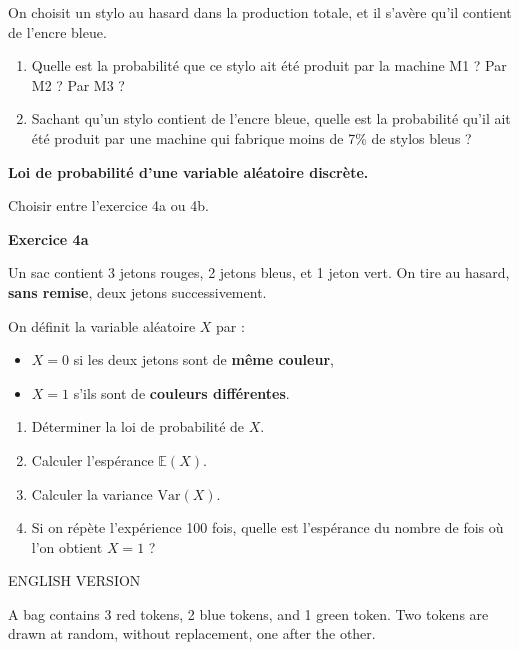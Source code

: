 \documentclass[a4paper,12pt]{article}
\begin{document}
On choisit un stylo au hasard dans la production totale, et il s'avère qu'il contient de l'encre bleue.

\begin{enumerate}
\item
Quelle est la probabilité que ce stylo ait été produit par la machine M1 ? Par M2 ? Par M3 ?
\item
Sachant qu’un stylo contient de l’encre bleue, quelle est la probabilité qu’il ait été produit par une machine qui fabrique moins de 7\% de stylos bleus ?
\end{enumerate}

\hline

\vspace{1em}


\textbf{Loi de probabilité d'une variable aléatoire discrète.}
\begin{center}
{\Large Choisir entre l'exercice 4a ou 4b.}
\end{center}
\bigskip
\noindent
\textbf{Exercice 4a }

Un sac contient 3 jetons rouges, 2 jetons bleus, et 1 jeton vert.  
On tire au hasard, \textbf{sans remise}, deux jetons successivement.

On définit la variable aléatoire $X$ par :
\begin{itemize}
    \item $X = 0$ si les deux jetons sont de \textbf{même couleur},
    \item $X = 1$ s’ils sont de \textbf{couleurs différentes}.
\end{itemize}

\begin{enumerate}
    \item Déterminer la loi de probabilité de $X$.
    \item Calculer l’espérance $\mathbb{E}(X)$.
    \item Calculer la variance $\mathrm{Var}(X)$.
    \item Si on répète l’expérience 100 fois, quelle est l’espérance du nombre de fois où l’on obtient $X = 1$ ?
\end{enumerate}


\vspace{1em}
\begin{center}
ENGLISH VERSION
\end{center}

A bag contains 3 red tokens, 2 blue tokens, and 1 green token.  
Two tokens are drawn at random, without replacement, one after the other.
\end{document}
